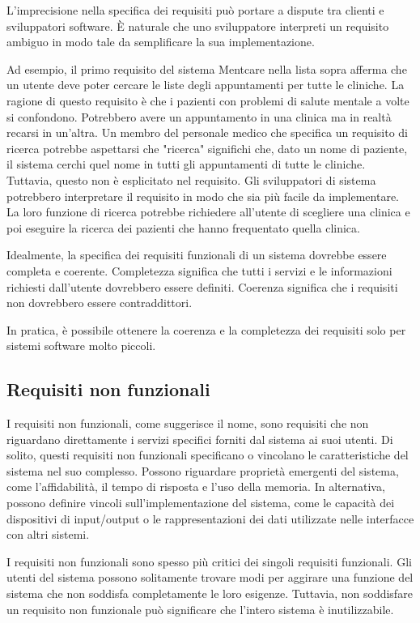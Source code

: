 L'imprecisione nella specifica dei requisiti può portare a dispute tra clienti e sviluppatori software. È naturale che uno sviluppatore interpreti un requisito ambiguo in modo tale da semplificare la sua implementazione.

Ad esempio, il primo requisito del sistema Mentcare nella lista sopra afferma che un utente deve poter cercare le liste degli appuntamenti per tutte le cliniche. La ragione di questo requisito è che i pazienti con problemi di salute mentale a volte si confondono. Potrebbero avere un appuntamento in una clinica ma in realtà recarsi in un'altra. Un membro del personale medico che specifica un requisito di ricerca potrebbe aspettarsi che "ricerca" significhi che, dato un nome di paziente, il sistema cerchi quel nome in tutti gli appuntamenti di tutte le cliniche. Tuttavia, questo non è esplicitato nel requisito. Gli sviluppatori di sistema potrebbero interpretare il requisito in modo che sia più facile da implementare. La loro funzione di ricerca potrebbe richiedere all'utente di scegliere una clinica e poi eseguire la ricerca dei pazienti che hanno frequentato quella clinica.

Idealmente, la specifica dei requisiti funzionali di un sistema dovrebbe essere completa e coerente. Completezza significa che tutti i servizi e le informazioni richiesti dall'utente dovrebbero essere definiti. Coerenza significa che i requisiti non dovrebbero essere contraddittori.

In pratica, è possibile ottenere la coerenza e la completezza dei requisiti solo per sistemi software molto piccoli.

\subsection{Requisiti non funzionali}
I requisiti non funzionali, come suggerisce il nome, sono requisiti che non riguardano direttamente i servizi specifici forniti dal sistema ai suoi utenti. Di solito, questi requisiti non funzionali specificano o vincolano le caratteristiche del sistema nel suo complesso. Possono riguardare proprietà emergenti del sistema, come l'affidabilità, il tempo di risposta e l'uso della memoria. In alternativa, possono definire vincoli sull'implementazione del sistema, come le capacità dei dispositivi di input/output o le rappresentazioni dei dati utilizzate nelle interfacce con altri sistemi.

I requisiti non funzionali sono spesso più critici dei singoli requisiti funzionali. Gli utenti del sistema possono solitamente trovare modi per aggirare una funzione del sistema che non soddisfa completamente le loro esigenze. Tuttavia, non soddisfare un requisito non funzionale può significare che l'intero sistema è inutilizzabile.

